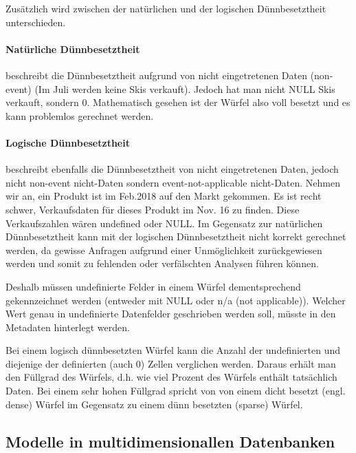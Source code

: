\documentclass[a4paper, 11pt, nofootinbib]{article}
\begin{document}
\noindent Zusätzlich wird zwischen der natürlichen und der logischen Dünnbesetztheit unterschieden.

\paragraph{Natürliche Dünnbesetztheit} beschreibt die Dünnbesetztheit aufgrund von nicht eingetretenen Daten (non-event) (Im Juli werden keine Skis verkauft). Jedoch hat man nicht NULL Skis verkauft, sondern 0. Mathematisch gesehen ist der Würfel also voll besetzt und es kann problemlos gerechnet werden.

\paragraph{Logische Dünnbesetztheit} beschreibt ebenfalls die Dünnbesetztheit von nicht eingetretenen Daten, jedoch nicht non-event nicht-Daten sondern event-not-applicable nicht-Daten. Nehmen wir an, ein Produkt ist im Feb.2018 auf den Markt gekommen. Es ist recht schwer, Verkaufsdaten für dieses Produkt im Nov. 16 zu finden. Diese Verkaufszahlen wären undefined oder NULL. Im Gegensatz zur natürlichen Dünnbesetztheit kann mit der logischen Dünnbesetztheit nicht korrekt gerechnet werden, da gewisse Anfragen aufgrund einer Unmöglichkeit zurückgewiesen werden und somit zu fehlenden oder verfälschten Analysen führen können.

Deshalb müssen undefinierte Felder in einem Würfel dementsprechend gekennzeichnet werden (entweder mit NULL oder n/a (not applicable)). Welcher Wert genau in undefinierte Datenfelder geschrieben werden soll, müsste in den Metadaten hinterlegt werden.

\vspace{10px}

\noindent Bei einem logisch dünnbesetzten Würfel kann die Anzahl der undefinierten und diejenige der definierten (auch 0) Zellen verglichen werden. Daraus erhält man den Füllgrad des Würfels, d.h. wie viel Prozent des Würfels enthält tatsächlich Daten. Bei einem sehr hohen Füllgrad spricht von von einem dicht besetzt (engl. dense) Würfel im Gegensatz zu einem dünn besetzten (sparse) Würfel.

\newpage

\subsection{Modelle in multidimensionallen Datenbanken}
\end{document}
